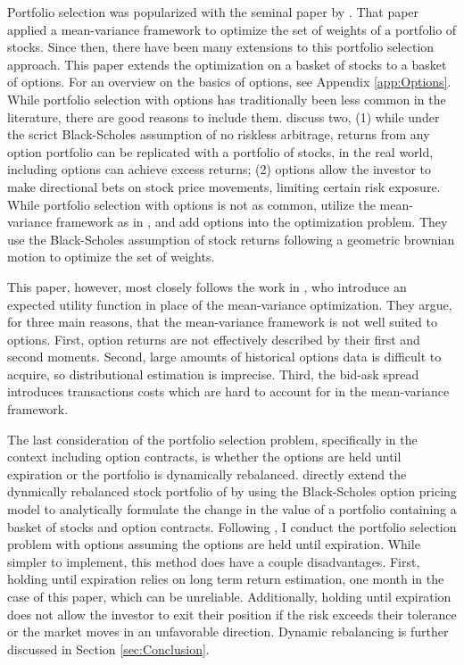 Portfolio selection was popularized with the seminal paper by \cite{markowitz}. That paper applied a mean-variance framework to optimize the set of weights of a portfolio of stocks. Since then, there have been many extensions to this portfolio selection approach. This paper extends the optimization on a basket of stocks to a basket of options. For an overview on the basics of options, see Appendix \ref{app:Options}. While portfolio selection with options has traditionally been less common in the literature, there are good reasons to include them. \cite{zhao2018markowitz} discuss two, (1) while under the scrict Black-Scholes assumption of no riskless arbitrage, returns from any option portfolio can be replicated with a portfolio of stocks, in the real world, including options can achieve excess returns; (2) options allow the investor to make directional bets on stock price movements, limiting certain risk exposure. While portfolio selection with options is not as common, \cite{zhao2018markowitz} utilize the mean-variance framework as in \cite{markowitz}, and add options into the optimization problem. They use the Black-Scholes assumption of stock returns following a geometric brownian motion to optimize the set of weights. 

This paper, however, most closely follows the work in \cite{faias2017optimal}, who introduce an expected utility function in place of the mean-variance optimization. They argue, for three main reasons, that the mean-variance framework is not well suited to options. First, option returns are not effectively described by their first and second moments. Second, large amounts of historical options data is difficult to acquire, so distributional estimation is imprecise. Third, the bid-ask spread introduces transactions costs which are hard to account for in the mean-variance framework.


The last consideration of the portfolio selection problem, specifically in the context including option contracts, is whether the options are held until expiration or the portfolio is dynamically rebalanced. \cite{zhao2018markowitz} directly extend the dynmically rebalanced stock portfolio of \cite{markowitz} by using the Black-Scholes option pricing model to analytically formulate the change in the value of a portfolio containing a basket of stocks and option contracts. Following \cite{faias2017optimal}, I conduct the portfolio selection problem with options assuming the options are held until expiration. While simpler to implement, this method does have a couple disadvantages. First, holding until expiration relies on long term return estimation, one month in the case of this paper, which can be unreliable. Additionally, holding until expiration does not allow the investor to exit their position if the risk exceeds their tolerance or the market moves in an unfavorable direction. Dynamic rebalancing is further discussed in Section \ref{sec:Conclusion}.

